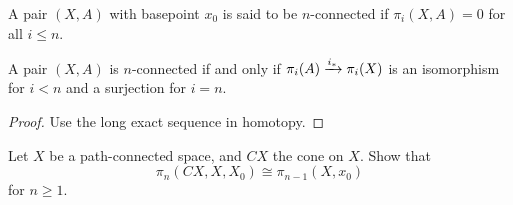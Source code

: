 \documentclass[ma3408.tex]{subfiles}
\begin{document}
\begin{Def}
	A pair $(X,A)$ with basepoint $x_0$ is said to be $n$-connected if $\pi_i(X,A) = 0$ for all $i \le n$. 
\end{Def}
\begin{Lem}
	A pair $(X,A)$ is $n$-connected if and only if $\pi_i(A) \xrightarrow{i_*} \pi_i(X)$ is an isomorphism for $i < n$ and a surjection for $i = n$. 
\end{Lem}
\begin{proof}
	Use the long exact sequence in homotopy. 
\end{proof}
\begin{exercise}{}{}
Let $X$ be a path-connected space, and $CX$ the cone on $X$. Show that 
	\[
\pi_n(CX,X,X_0) \cong \pi_{n-1}(X,x_0)
	\]
	for $n \ge 1$. 
\end{exercise}
\end{document}
